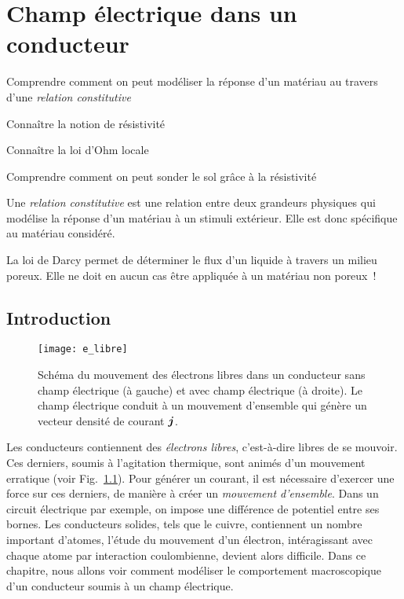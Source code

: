 \chapter{Champ électrique dans un conducteur}
\label{chap:metaux}
\begin{objectif}
	\item Comprendre comment on peut modéliser la réponse 
		d'un matériau au travers d'une \emph{relation constitutive}
	\item Connaître la notion de résistivité
	\item Connaître la loi d'Ohm locale
	\item Comprendre comment on peut sonder le sol grâce à la résistivité
\end{objectif}

\begin{defn}
	Une \emph{relation constitutive} est une relation entre deux grandeurs
	physiques qui modélise la réponse d'un matériau à un stimuli extérieur.
	Elle est donc spécifique au matériau considéré.
\end{defn}

\begin{exemple}
	La loi de Darcy permet de déterminer le flux d'un liquide à travers 
	un milieu poreux. Elle ne doit en aucun cas être appliquée à un matériau
	non poreux~!
\end{exemple}
\section*{Introduction}
\begin{figure}[]
	\centering
	\texttt{[image: e\_libre]}
	\caption{Schéma du mouvement des électrons libres dans un conducteur
		 sans champ électrique (à gauche) et avec champ électrique 
	 	 (à droite). Le champ électrique conduit à un mouvement 
	 	d'ensemble qui génère un vecteur densité de courant $\mitbf{j}$.}%
	\label{fig:e_libre}
\end{figure}

Les conducteurs contiennent des \emph{électrons libres}, c'est-à-dire libres de se 
mouvoir. Ces derniers, soumis à l'agitation thermique, sont animés d'un mouvement
erratique (voir Fig.~\ref{fig:e_libre}). 
Pour générer un courant, il est nécessaire
d'exercer une force sur ces derniers, de manière à créer un \emph{mouvement d'ensemble}.
Dans un circuit électrique par exemple, on impose une différence de potentiel 
entre ses bornes. Les conducteurs solides, tels que le cuivre, contiennent
un nombre important d'atomes, l'étude du mouvement d'un électron, intéragissant
avec chaque atome par interaction coulombienne, devient alors 
difficile.
Dans ce chapitre, nous allons voir comment modéliser le comportement macroscopique 
d'un conducteur soumis à un champ électrique.

